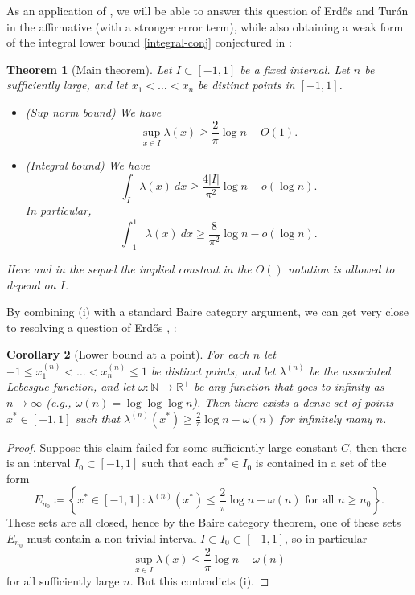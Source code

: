 \documentclass[12pt]{amsart}
\newtheorem{theorem}{Theorem}[section]
\newtheorem{corollary}[theorem]{Corollary}
\newcommand{\R}{\mathbb{R}}
\newcommand{\N}{\mathbb{N}}
\begin{document}
As an application of , we will be able to answer this question of Erd\H{o}s and Tur\'an in the affirmative (with a stronger error term), while also obtaining a weak form of the integral lower bound \eqref{integral-conj} conjectured in \cite{erd-cluj}:

\begin{theorem}[Main theorem]\label{main}  Let $I \subset [-1,1]$ be a fixed interval.  Let $n$ be sufficiently large, and let $x_1 < \dots < x_n$ be distinct points in $[-1,1]$.
    \begin{itemize}
  \item[(i)] (Sup norm bound) We have
        \begin{equation}\label{erdos-conj}
     \sup_{x \in I} \lambda(x) \geq \frac{2}{\pi} \log n - O(1).
\end{equation}
\item[(ii)] (Integral bound) We have
\begin{equation}\label{erdos-conj-2}
     \int_I \lambda(x)\ dx \geq \frac{4|I|}{\pi^2} \log n - o(\log n).
\end{equation}
In particular,
$$ \int_{-1}^1 \lambda(x)\ dx \geq \frac{8}{\pi^2} \log n - o(\log n).$$
    \end{itemize}
Here and in the sequel the implied constant in the $O()$ notation is allowed to depend on $I$.
\end{theorem}

By combining (i) with a standard Baire category argument, we can get very close to resolving a question of Erd\H{o}s \cite[p. 68]{erd-cluj}, \cite[Problem 1132]{bloom}:

\begin{corollary}[Lower bound at a point]\label{div}  For each $n$ let $-1 \leq x^{(n)}_1 < \dots < x^{(n)}_n \leq 1$ be distinct points, and let $\lambda^{(n)}$ be the associated Lebesgue function, and let $\omega \colon \N \to \R^+$ be any function that goes to infinity as $n \to \infty$ (e.g., $\omega(n) = \log\log\log n$).  Then there exists a dense set of points $x^* \in [-1,1]$ such that $\lambda^{(n)}(x^*) \geq \frac{2}{\pi} \log n - \omega(n)$ for infinitely many $n$.
\end{corollary}

\begin{proof}  Suppose this claim failed for some sufficiently large constant $C$, then there is an interval $I_0 \subset [-1,1]$ such that each $x^* \in I_0$ is contained in a set of the form
    $$ E_{n_0} \coloneqq \left \{ x^* \in [-1,1]: \lambda^{(n)}(x^*) \leq \frac{2}{\pi} \log n - \omega(n) \text{ for all } n \geq n_0 \right \}.$$
These sets are all closed, hence by the Baire category theorem, one of these sets $E_{n_0}$ must contain a non-trivial interval $I \subset I_0 \subset [-1,1]$, so in particular
$$ \sup_{x \in I} \lambda(x) \leq \frac{2}{\pi} \log n - \omega(n)$$
for all sufficiently large $n$.  But this contradicts (i).
\end{proof}
\end{document}
